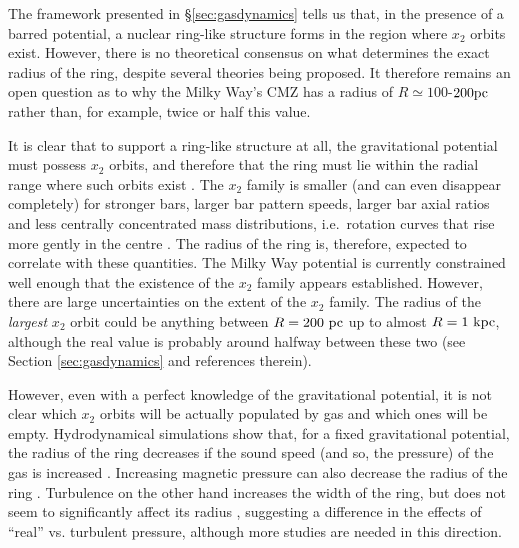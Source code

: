 The framework presented in \S\ref{sec:gasdynamics} tells us that, in the presence of a barred potential, a nuclear ring-like structure forms in the region where $x_2$ orbits exist. 
However, there is no theoretical consensus on what determines the exact radius of the ring, despite several theories being proposed. 
It therefore remains an open question as to why the Milky Way's CMZ has a radius of $R\simeq100$-$200\mbox{${\rm pc}$}$ rather than, for example, twice or half this value.

It is clear that to support a ring-like structure at all, the gravitational potential must possess $x_2$ orbits, and therefore that the ring must lie within the radial range where such orbits exist \citep{Athanassoula1992b,Regan2003,Kim2012b}.  The $x_2$ family is smaller (and can even disappear completely) for stronger bars, larger bar pattern speeds, larger bar axial ratios and less centrally concentrated mass distributions, i.e.\ rotation curves that rise more gently in the centre \citep{Athanassoula1992a}. The radius of the ring is, therefore, expected to correlate with these quantities. 
The Milky Way potential is currently constrained well enough that the existence of the $x_2$ family appears established. However, there are large uncertainties on the extent of the $x_2$ family. The radius of the \emph{largest} $x_2$ orbit could be anything between $R=200~\mbox{${\rm pc}$}$ up to almost $R=1~\mbox{${\rm kpc}$}$, although the real value is probably around halfway between these two (see Section \ref{sec:gasdynamics} and references therein).

However, even with a perfect knowledge of the gravitational potential, it is not clear which $x_2$ orbits will be actually populated by gas and which ones will be empty. Hydrodynamical simulations show that, for a fixed gravitational potential, the radius of the ring decreases if the sound speed (and so, the pressure) of the gas is increased \citep{Englmaier1997,Patsis2000,Sormani2015c,Li2015}. Increasing magnetic pressure can also decrease the radius of the ring \citep{Kim2012c}. Turbulence on the other hand increases the width of the ring, but does not seem to significantly affect its radius \citep{Salas2020}, suggesting a difference in the effects of ``real'' vs. turbulent pressure, although more studies are needed in this direction.

